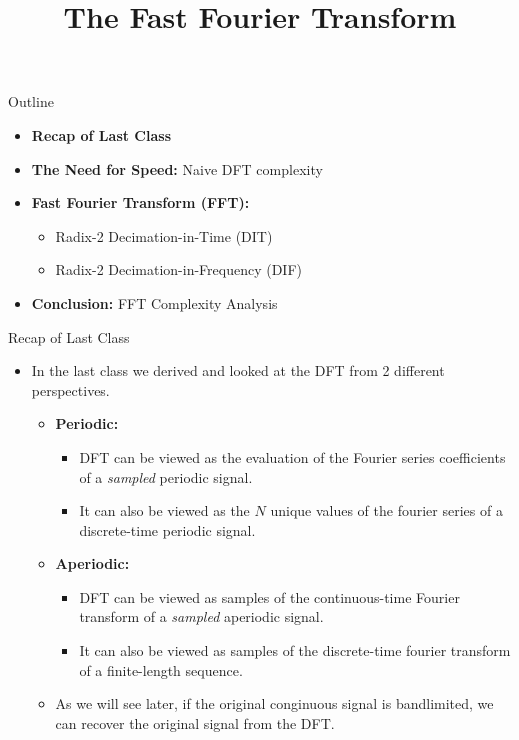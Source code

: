 

\title{The Fast Fourier Transform}



\maketitle

\begin{frame}{Outline}
    \begin{itemize}
        \item \textbf{Recap of Last Class}
        \item \textbf{The Need for Speed:} Naive DFT complexity
        \item \textbf{Fast Fourier Transform (FFT):}
              \begin{itemize}
                  \item Radix-2 Decimation-in-Time (DIT)
                  \item Radix-2 Decimation-in-Frequency (DIF)
              \end{itemize}
        \item \textbf{Conclusion:} FFT Complexity Analysis
    \end{itemize}
\end{frame}

\begin{frame}{Recap of Last Class}
    \begin{itemize}
        \item In the last class we derived and looked at the DFT from 2 different perspectives.
              \begin{itemize}
                  \item \textbf{Periodic:}
                        \begin{itemize}
                            \item DFT can be viewed as the evaluation of the Fourier series coefficients of a \emph{sampled} periodic signal.
                            \item It can also be viewed as the $N$ unique values of the fourier series of a discrete-time periodic signal.
                        \end{itemize}
                  \item \textbf{Aperiodic:}
                        \begin{itemize}
                            \item DFT can be viewed as samples of the continuous-time Fourier transform of a \emph{sampled} aperiodic signal.
                            \item It can also be viewed as samples of the discrete-time fourier transform of a finite-length sequence.
                        \end{itemize}
                  \item As we will see later, if the original conginuous signal is bandlimited, we can recover the original signal from the DFT.
              \end{itemize}
    \end{itemize}
\end{frame}

